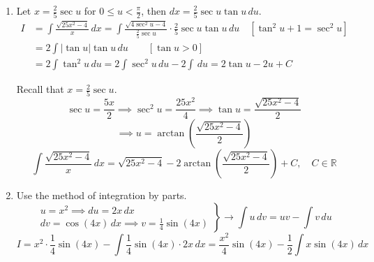 \documentclass[a4paper, 12pt]{article}
\begin{document}
\begin{enumerate}[leftmargin=*,label=\textbf{\arabic*.}]
\begin{enumerate}[leftmargin=*,label=\textbf{\alph*.}]
Rewrite the integral in \eqref{eq:14_15_summer_final_11} using \eqref{eq:14_15_summer_final_12} and \eqref{eq:14_15_summer_final_13}.
\begin{equation}\frac45\int\frac1{\left(x^2+4\right)^2}\,dx-\frac15\int\frac x{\left(x^2+4\right)^2}\,dx=\frac1{20}\left(\arctan\frac x2+\frac{2x+2}{x^2+4}\right)+C_6\label{eq:14_15_summer_final_14}\end{equation}

Eventually, using \eqref{eq:14_15_summer_final_8}, \eqref{eq:14_15_summer_final_9}, \eqref{eq:14_15_summer_final_10}, and \eqref{eq:14_15_summer_final_14}, rewrite \eqref{eq:14_15_summer_final_7}.
\[\boxed{I=-\frac{14}{25}\ln\left|x-1\right|-\frac2{x-1}+\frac7{25}\ln\left(x^2+4\right)-\frac{67}{100}\arctan\frac x2+\frac{x+1}{10\left(x^2+4\right)}+C_0}\]

\item Let $\displaystyle x=\frac25\sec u$ for $\displaystyle 0\leq u<\frac\pi2$, then $dx=\displaystyle\frac25\sec u\tan u\,du$.
\begin{align*}I&=\int\frac{\sqrt{25x^2-4}}{x}\,dx=\int\frac{\sqrt{4\sec^2u-4}}{\frac25\sec u}\cdot\frac25\sec u\tan u\,du\quad\left[\tan^2u+1=\sec^2u\right]\\[1em]
&=2\int\left|\tan u\right|\tan u\,du\qquad\left[\tan u>0\right]\\[1em]&=2\int\tan^2u\,du=2\int\sec^2u\,du-2\int\,du=2\tan u-2u+C\end{align*}

Recall that $\displaystyle x=\frac25\sec u$.
\vspace{-1em}
\[\sec u=\frac{5x}2\implies\sec^2u=\frac{25x^2}4\implies\tan u=\frac{\sqrt{25x^2-4}}2\]
\vspace{-1.5em}
\[\implies u=\arctan\left(\frac{\sqrt{25x^2-4}}2\right)\]
\[\int\frac{\sqrt{25x^2-4}}{x}\,dx=\boxed{\sqrt{25x^2-4}-2\arctan\left(\frac{\sqrt{25x^2-4}}2\right)+C,\quad C\in\mathbb{R}}\]

\item Use the method of integration by parts.
\[
\left.\begin{array}{c}
u=x^2\implies du=2x\,dx\\[1em]
\displaystyle dv=\cos(4x)\,dx\implies v=\frac14\sin(4x)
\end{array}\right\}\rightarrow\int u\,dv=uv-\int v\,du
\]
\[I=x^2\cdot\frac14\sin(4x)-\int\frac14\sin(4x)\cdot2x\,dx=\frac{x^2}4\sin(4x)-\frac12\int x\sin(4x)\,dx\]


\end{enumerate}
\end{enumerate}
\end{document}
